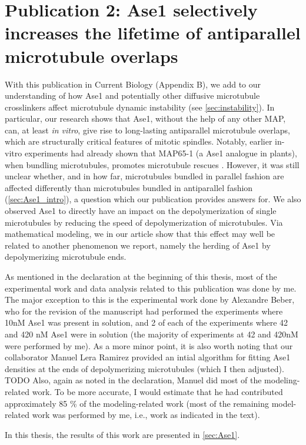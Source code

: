 \section{Publication 2: Ase1 selectively increases the lifetime of antiparallel microtubule overlaps}
With this publication in Current Biology \parencite{Krattenmacher2024} (Appendix B), we add to our understanding of how Ase1 and potentially other diffusive microtubule crosslinkers affect microtubule dynamic instability (see \autoref{sec:instability}). In particular, our research shows that Ase1, without the help of any other MAP, can, at least \textit{in vitro}, give rise to long-lasting antiparallel microtubule overlaps, which are structurally critical features of mitotic spindles. Notably, earlier in-vitro experiments had already shown that MAP65-1 (a Ase1 analogue in plants), when bundling microtubules, promotes microtubule rescues \parencite{Stoppin-Mellet2013}. However, it was still unclear whether, and in how far, microtubules bundled in parallel fashion are affected differently than microtubules bundled in antiparallel fashion (\autoref{sec:Ase1_intro}), a question which our publication provides answers for. We also observed Ase1 to directly have an impact on the depolymerization of single microtubules by reducing the speed of depolymerization of microtubules. Via mathematical modeling, we in our article show that this effect may well be related to another phenomenon we report, namely the herding of Ase1 by depolymerizing microtubule ends. \par

As mentioned in the declaration at the beginning of this thesis, most of the experimental work and data analysis related to this publication was done by me. The major exception to this is the experimental work done by Alexandre Beber, who for the revision of the manuscript had performed the experiments where 10nM Ase1 was present in solution, and 2 of each of the experiments where 42 and 420 nM Ase1 were in solution (the majority of experiments at 42 and 420nM were performed by me). As a more minor point, it is also worth noting that our collaborator Manuel Lera Ramirez provided an intial algorithm for fitting Ase1 densities at the ends of depolymerizing microtubules (which I then adjusted). TODO Also, again as noted in the declaration, Manuel did most of the modeling-related work. To be more accurate, I would estimate that he had contributed approximately 85 \% of the modeling-related work (most of the remaining model-related work was performed by me, i.e., work as indicated in the text).\par

In this thesis, the results of this work are presented in \autoref{sec:Ase1}.